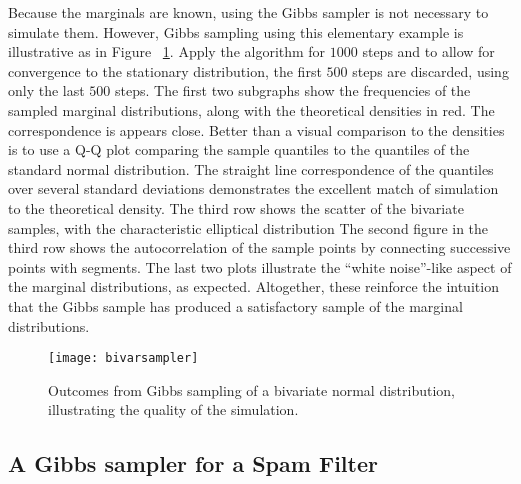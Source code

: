 \documentclass[12pt]{article}
\begin{document}
Because the marginals are known, using the Gibbs sampler is not
necessary to simulate them.  However, Gibbs sampling using this
elementary example is illustrative as in Figure~%
\ref{fig:gibbsampler:bivarsampler}.  Apply the algorithm for \( 1000 \)
steps and to allow for convergence to the stationary distribution, the
first \( 500 \) steps are discarded, using only the last \( 500 \)
steps.  The first two subgraphs show the frequencies of the sampled
marginal distributions, along with the theoretical densities in red.
The correspondence is appears close.  Better than a visual comparison to
the densities is to use a Q-Q plot comparing the sample quantiles to the
quantiles of the standard normal distribution.  The straight line
correspondence of the quantiles over several standard deviations
demonstrates the excellent match of simulation to the theoretical
density.  The third row shows the scatter of the bivariate samples, with
the characteristic elliptical distribution The second figure in the
third row shows the autocorrelation of the sample points by connecting
successive points with segments.  The last two plots illustrate the
``white noise''-like aspect of the marginal distributions, as expected.
Altogether, these reinforce the intuition that the Gibbs sample has
produced a satisfactory sample of the marginal distributions.

\begin{figure}
    \centering
    \texttt{[image: bivarsampler]}
    \caption{Outcomes from Gibbs sampling of a bivariate normal
    distribution, illustrating the quality of the simulation.}%
    \label{fig:gibbsampler:bivarsampler}
\end{figure}

\subsection*{A Gibbs sampler for a Spam Filter}
\end{document}
